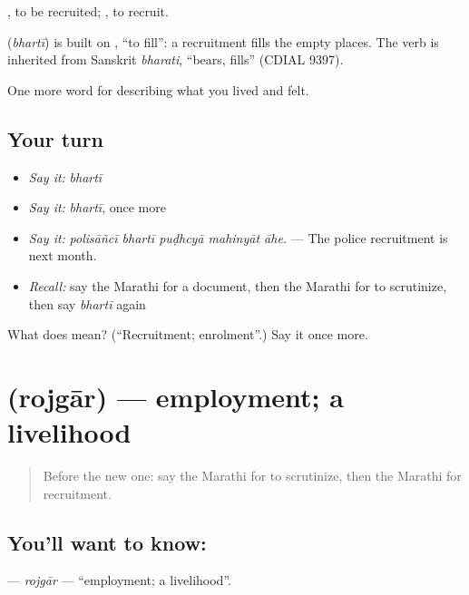  , to be recruited;  , to recruit.

\begin{cousinweb}
\textbf{} (\emph{bhartī}) is built on , \textquotedblleft{}to fill\textquotedblright{}: a recruitment fills the empty places. The verb is inherited from Sanskrit \emph{bharati}, \textquotedblleft{}bears, fills\textquotedblright{} (CDIAL 9397).
\end{cousinweb}

\begin{grammarlens}[title={What you've built}]
One more word for describing what you lived and felt.
\end{grammarlens}

\subsection*{Your turn}
\begin{itemize}
\raggedright
  \item \emph{Say it:} \emph{bhartī}
  \item \emph{Say it:} \emph{bhartī}, once more
  \item \emph{Say it:} \emph{polisāñcī bhartī puḍhcyā mahinyāt āhe.} — The police recruitment is next month.
  \item \emph{Recall:} say the Marathi for a document, then the Marathi for to scrutinize, then say \emph{bhartī} again
\end{itemize}

\begin{tcolorbox}[breakable,colback=teal!4,colframe=teal!35!black,title={Before you move on}]
What does  mean? (\textquotedblleft{}Recruitment; enrolment\textquotedblright{}.) Say it once more.
\end{tcolorbox}
\section[\texorpdfstring{\mr{रोजगार} (rojgār)}{रोजगार (rojgār)}]{ (rojgār) — employment; a livelihood}

\label{lesson:MR-C507-rojgar}



\begin{quote}
Before the new one: say the Marathi for to scrutinize, then the Marathi for recruitment.
\end{quote}

\subsection*{You'll want to know: }
\textbf{} — \emph{rojgār} — \textquotedblleft{}employment; a livelihood\textquotedblright{}.

